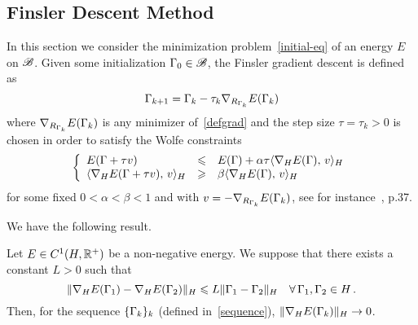 \subsection{Finsler Descent Method}
\label{subsec-finsler-descent}

In this section we consider the minimization problem~\eqref{initial-eq} of  an energy $E$ on  $\mathcal{B}$. Given some initialization $\Gamma_0 \in \mathcal{B}$, the Finsler gradient descent is defined as
\begin{equation}\label{sequence}
	\Gamma_{k+1} = \Gamma_k - \tau_k \nabla_{R_{\Gamma_k}} E(\Gamma_k)
\end{equation}
where  $\nabla_{R_{\Gamma_k}} E(\Gamma_k)$ is any minimizer of~\eqref{defgrad} and the step size $\tau=\tau_k>0$ is chosen in order to satisfy the Wolfe constraints 
\begin{equation}\label{Wolfe}
\left\{
\begin{array}{lll}
	E(\Gamma+\tau v)&\leqslant& E(\Gamma)+\alpha\tau \langle \nabla_{H}E(\Gamma),\,v\rangle_{H}\\
	\langle  \nabla_{H}E(\Gamma+\tau v) ,\, v \rangle_{H} &\geqslant& \beta \langle \nabla_{H}E(\Gamma) ,\, v \rangle_{H}
\end{array}\right.
\end{equation}
for some  fixed $0<\alpha<\beta<1$ and with $v = -\nabla_{R_{\Gamma_k}} E(\Gamma_k)$, see for instance~\cite{Nocedal}, p.37. 


We have the following result.

\begin{thm}\label{convergence} 
Let $E\in C^1(H, {\mathbb R}^+)$ be a non-negative energy. We suppose that 
there exists a constant $L>0$ such that 
\begin{equation}\label{grad-lip}
\|\nabla_{H} E (\Gamma_1) - \nabla_{H} E (\Gamma_2)\|_H \leqslant L \|\Gamma_1-\Gamma_2\|_H\quad \forall\, \Gamma_1, \Gamma_2 \in H\,.
\end{equation}
Then, for the sequence  $\{\Gamma_k\}_k$ (defined in~\eqref{sequence}),
$\|\nabla_{H} E(\Gamma_{k})\|_H\rightarrow 0$. 

\end{thm}

